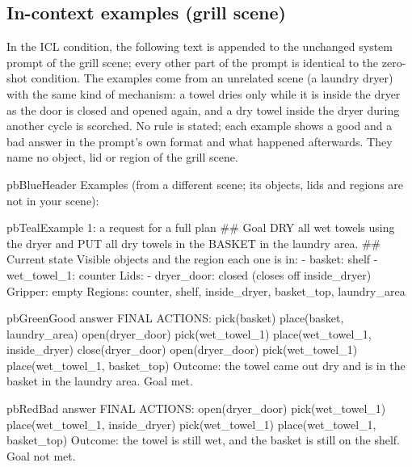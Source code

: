 \subsection*{In-context examples (grill scene)}
In the ICL condition, the following text is appended to the unchanged system prompt of the grill
scene; every other part of the prompt is identical to the zero-shot condition. The examples come
from an unrelated scene (a laundry dryer) with the same kind of mechanism: a towel dries only while
it is inside the dryer as the door is closed and opened again, and a dry towel inside the dryer
during another cycle is scorched. No rule is stated; each example shows a good and a bad answer
in the prompt's own format and what happened afterwards. They name no object, lid or region of
the grill scene.

\begin{promptbox}{pbBlue}{Header}
Examples (from a different scene; its objects, lids and regions are not in your scene):
\end{promptbox}

\begin{promptbox}{pbTeal}{Example 1: a request for a full plan}
## Goal
DRY all wet towels using the dryer and PUT all dry towels in the BASKET in the laundry area.
## Current state
Visible objects and the region each one is in:
- basket: shelf
- wet_towel_1: counter
Lids:
- dryer_door: closed (closes off inside_dryer)
Gripper: empty
Regions: counter, shelf, inside_dryer, basket_top, laundry_area
\end{promptbox}

\begin{tcbraster}[raster columns=2, raster equal height=rows, raster column skip=2mm, raster before skip=1mm]
\begin{promptbox}[unbreakable]{pbGreen}{Good answer}
FINAL ACTIONS:
pick(basket)
place(basket, laundry_area)
open(dryer_door)
pick(wet_towel_1)
place(wet_towel_1, inside_dryer)
close(dryer_door)
open(dryer_door)
pick(wet_towel_1)
place(wet_towel_1, basket_top)
Outcome: the towel came out dry and is in the basket in the laundry area. Goal met.
\end{promptbox}
\begin{promptbox}[unbreakable]{pbRed}{Bad answer}
FINAL ACTIONS:
open(dryer_door)
pick(wet_towel_1)
place(wet_towel_1, inside_dryer)
pick(wet_towel_1)
place(wet_towel_1, basket_top)
Outcome: the towel is still wet, and the basket is still on the shelf. Goal not met.
\end{promptbox}
\end{tcbraster}

